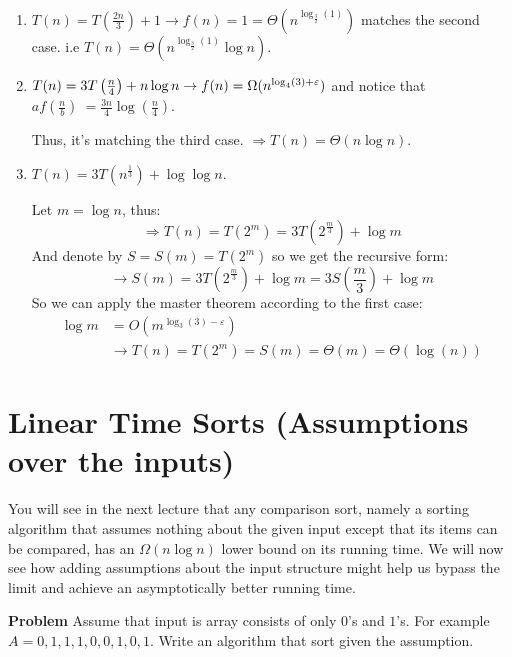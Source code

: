 \begin{example}\ 
\begin{enumerate}
    \item \( T(n) =  T(\frac{2n}{3}) + 1 \rightarrow f(n) = 1 =\Theta ( n^{\log_{\frac{3}{2}} (1)})\) matches the second case. i.e  \( T(n) = \Theta ( n^{\log_{\frac{3}{2}} (1)}\log n )\).
    
    \item \( T(n) = 3 T\left(\frac{n}{4}\right) + n\log n \rightarrow f(n) = \Omega( n^{\log_{4}(3) + \varepsilon}  ) \) and notice that \( af( \frac{n}{b})~=\frac{3n}{4}\log(\frac{n}{4})\). 

      Thus, it's matching the third case. \(\Rightarrow T(n) = \Theta(n\log n)\).
    
    \item \(T(n) = 3T( n^{\frac{1}{3}}) + \log\log n\). 

      Let $ m = \log n $, thus: $$\Rightarrow T( n) = T (2^m ) = 3T(2^{\frac{m}{3}} ) + \log m $$  
      And denote by $ S = S(m) = T(2^m) $ so we get the recursive form: $$\rightarrow S(m) = 3T(2^{\frac{m}{3}} ) + \log m = 3S(\frac{m}{3} ) + \log m $$ 
      So we can apply the master theorem according to the first case:  \begin{equation*}
        \begin{split}
      \log m &= O(m^{\log_{3}(3)-\varepsilon} ) \\ 
      & \rightarrow T(n) = T(2^m) = S(m) = \Theta(m) = \Theta( \log(n)) 
        \end{split}
      \end{equation*}
\end{enumerate}
\end{example}



\section{Linear Time Sorts (Assumptions over the inputs)}
You will see in the next lecture that any comparison sort, namely a sorting algorithm that assumes nothing about the given input except that its items can be compared, has an \(\Omega(n\log n)\) lower bound on its running time. We will now see how adding assumptions about the input structure might help us bypass the limit and achieve an asymptotically better running time.

\begin{example} \textbf{Problem} Assume that input is array consists of only $0$'s and $1$'s. For example $A = 0,1,1,1,0,0,1,0,1$. Write an algorithm that sort given the assumption.

\end{example}



